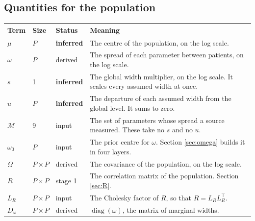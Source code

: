 \documentclass[11pt]{article}
\newcommand{\Mset}{\mathcal{M}}
\newcommand{\Tr}{^{\!\top}}
\DeclareMathOperator{\diag}{diag}
\newcommand{\INF}{\textcolor{accent}{\textbf{inferred}}}
\newcommand{\FIX}{\textcolor{softgray}{input}}
\newcommand{\DER}{\textcolor{softgray}{derived}}
\newcommand{\STG}{\textcolor{softgray}{stage 1}}
\begin{document}
\subsection*{Quantities for the population}
\begin{center}\small
\begin{tabularx}{\textwidth}{@{}lllX@{}}
\toprule
Term & Size & Status & Meaning \\
\midrule
$\mu$ & $P$ & \INF & The centre of the population, on the log scale. \\
$\omega$ & $P$ & \DER & The spread of each parameter between patients, on the log scale. \\
$s$ & 1 & \INF & The global width multiplier, on the log scale. It scales every assumed width at once. \\
$u$ & $P$ & \INF & The departure of each assumed width from the global level. It sums to zero. \\
$\Mset$ & 9 & \FIX & The set of parameters whose spread a source measured. These take no $s$ and no $u$. \\
$\omega_0$ & $P$ & \FIX & The prior centre for $\omega$. Section \ref{sec:omega} builds it in four layers. \\
$\Omega$ & $P\times P$ & \DER & The covariance of the population, on the log scale. \\
$R$ & $P\times P$ & \STG & The correlation matrix of the population. Section \ref{sec:R}. \\
$L_R$ & $P\times P$ & \FIX & The Cholesky factor of $R$, so that $R=L_R L_R\Tr$. \\
$D_\omega$ & $P\times P$ & \DER & $\diag(\omega)$, the matrix of marginal widths. \\
\bottomrule
\end{tabularx}
\end{center}
\end{document}
